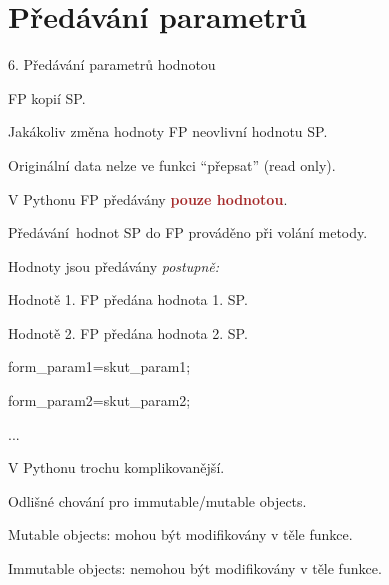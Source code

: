 \documentclass[czech]{beamer}
\newenvironment{lyxcode}
  {\par\begin{list}{}{
    \setlength{\rightmargin}{\leftmargin}
    \setlength{\listparindent}{0pt}%
    \raggedright
    \setlength{\itemsep}{0pt}
    \setlength{\parsep}{0pt}
    \normalfont\ttfamily}%
   \def\{{\char`\{}
   \def\}{\char`\}}
   \def\textasciitilde{\char`\~}
   \item[]}
  {\end{list}}
\begin{document}
\section{Předávání parametrů }
\begin{frame}{6. Předávání parametrů hodnotou}

{\small FP kopií SP. }{\small\par}

{\small Jakákoliv změna hodnoty FP neovlivní hodnotu SP.}{\small\par}

{\small Originální data nelze ve funkci ``přepsat'' (read only).\bigskip{}
}{\small\par}

{\small V Pythonu FP předávány }{\small\textbf{\textcolor{brown}{pouze
hodnotou}}}{\small .}{\small\par}

{\small Předávání~hodnot SP do FP prováděno při volání metody.}{\small\par}

{\small Hodnoty jsou předávány }{\small\emph{postupně:}}{\small\medskip{}
}{\small\par}

{\small Hodnotě 1. FP předána hodnota 1. SP.}{\small\par}

{\small Hodnotě 2. FP předána hodnota 2. SP.}{\small\par}
\begin{lyxcode}
{\small form\_param1=skut\_param1;}{\small\par}

{\small form\_param2=skut\_param2;}{\small\par}
\end{lyxcode}
{\small ...}{\small\par}

{\small\medskip{}
V Pythonu trochu komplikovanější.}{\small\par}

{\small Odlišné chování pro immutable/mutable objects.\medskip{}
}{\small\par}

{\small Mutable objects: mohou být modifikovány v těle funkce.}{\small\par}

{\small Immutable objects: nemohou být modifikovány v těle funkce.}{\small\par}
\end{frame}
\end{document}

